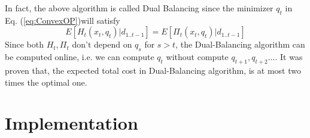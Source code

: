\documentclass[twoside]{article}
\begin{document}
\begin{multicols}{2}
    In fact, the above algorithm is called Dual Balancing since the minimizer $q_t$ in Eq. (\ref{eq:ConvexOP})will satisfy
    \begin{equation}\label{eq:DB}
        E[H_t(x_t,q_t)| d_{1..t-1}] = E[\Pi_t(x_t,q_t)| d_{1..t-1}]
        \end{equation}
      Since both $H_t,\Pi_t$ don't depend on $q_s$ for $s>t$, the Dual-Balancing algorithm can be computed online, i.e. we can compute $q_t$ without compute $q_{t+1}, q_{t+2} ... $. It was proven that, the expected total cost in Dual-Balancing algorithm,  is at most two times the optimal one\cite{CLAcha2}.


\section{Implementation}



\end{multicols}
\end{document}
